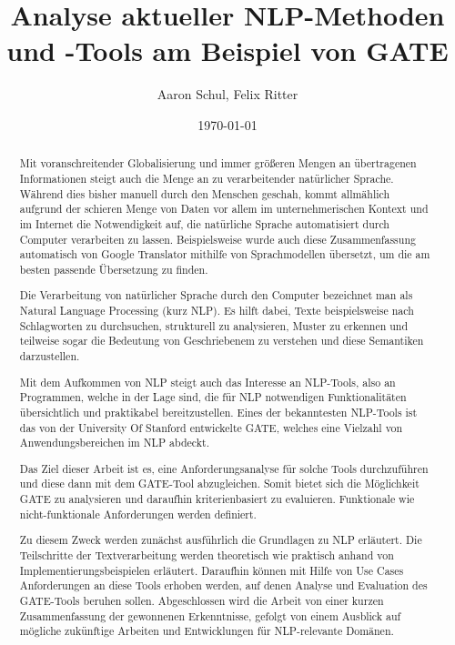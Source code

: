 \documentclass[12pt]{report}
\begin{document}
\title{Analyse aktueller NLP-Methoden und -Tools am Beispiel von GATE}
\author{Aaron Schul, Felix Ritter}
\date{\today}
\maketitle

\newpage
\begin{abstract}
Mit voranschreitender Globalisierung und immer größeren Mengen an übertragenen Informationen steigt auch die Menge an zu verarbeitender natürlicher Sprache. Während dies bisher manuell durch den Menschen geschah, kommt allmählich aufgrund der schieren Menge von Daten vor allem im unternehmerischen Kontext und im Internet die Notwendigkeit auf, die natürliche Sprache automatisiert durch Computer verarbeiten zu lassen. Beispielsweise wurde auch diese Zusammenfassung automatisch von Google Translator mithilfe von Sprachmodellen übersetzt, um die am besten passende Übersetzung zu finden.

Die Verarbeitung von natürlicher Sprache durch den Computer bezeichnet man als Natural Language Processing (kurz NLP). Es hilft dabei, Texte beispielsweise nach Schlagworten zu durchsuchen, strukturell zu analysieren, Muster zu erkennen und teilweise sogar die Bedeutung von Geschriebenem zu verstehen und diese Semantiken darzustellen.

Mit dem Aufkommen von NLP steigt auch das Interesse an NLP-Tools, also an Programmen, welche in der Lage sind, die für NLP notwendigen Funktionalitäten übersichtlich und praktikabel bereitzustellen. Eines der bekanntesten NLP-Tools ist das von der University Of Stanford entwickelte GATE, welches eine Vielzahl von Anwendungsbereichen im NLP abdeckt.

Das Ziel dieser Arbeit ist es, eine Anforderungsanalyse für solche Tools durchzuführen und diese dann mit dem GATE-Tool abzugleichen. Somit bietet sich die Möglichkeit GATE zu analysieren und daraufhin kriterienbasiert zu evaluieren. Funktionale wie nicht-funktionale Anforderungen werden definiert.

Zu diesem Zweck werden zunächst ausführlich die Grundlagen zu NLP erläutert. Die Teilschritte der Textverarbeitung werden theoretisch wie praktisch anhand von Implementierungsbeispielen erläutert. Daraufhin können mit Hilfe von Use Cases Anforderungen an diese Tools erhoben werden, auf denen Analyse und Evaluation des GATE-Tools beruhen sollen. Abgeschlossen wird die Arbeit von einer kurzen Zusammenfassung der gewonnenen Erkenntnisse, gefolgt von einem Ausblick auf mögliche zukünftige Arbeiten und Entwicklungen für NLP-relevante Domänen.
\end{abstract}
\end{document}
